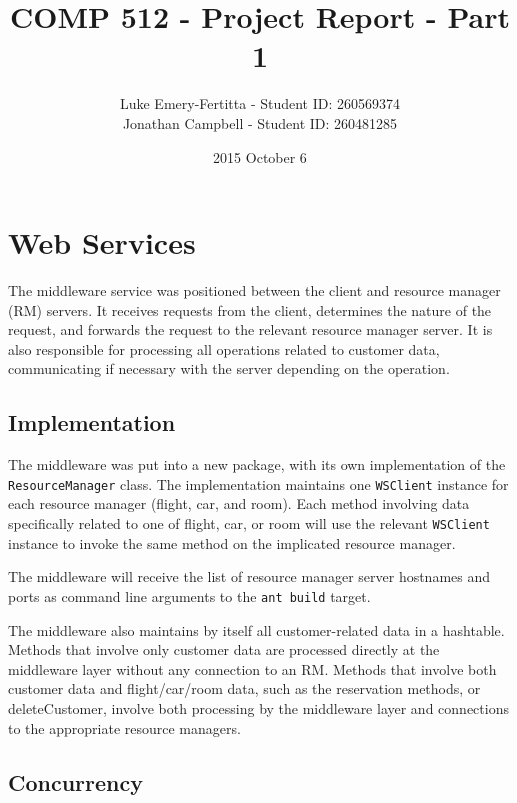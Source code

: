 \documentclass[11pt]{article}
\begin{document}
\title{COMP 512 - Project Report - Part 1}
\author{Luke Emery-Fertitta - Student ID: 260569374 \\ Jonathan Campbell - Student ID: 260481285}
\date{2015 October 6}
\maketitle

\section*{Web Services}

The middleware service was positioned between the client and resource manager (RM) servers. It receives requests from the client, determines the nature of the request, and forwards the request to the relevant resource manager server. It is also responsible for processing all operations related to customer data, communicating if necessary with the server depending on the operation. \par

\subsection*{Implementation} 

The middleware was put into a new package, with its own implementation of the \texttt{ResourceManager} class. The implementation maintains one \texttt{WSClient} instance for each resource manager (flight, car, and room). Each method involving data specifically related to one of flight, car, or room will use the relevant \texttt{WSClient} instance to invoke the same method on the implicated resource manager. \par

The middleware will receive the list of resource manager server hostnames and ports as command line arguments to the \texttt{ant build} target. \par

The middleware also maintains by itself all customer-related data in a hashtable. Methods that involve only customer data are processed directly at the middleware layer without any connection to an RM. Methods that involve both customer data and flight/car/room data, such as the reservation methods, or deleteCustomer, involve both processing by the middleware layer and connections to the appropriate resource managers. \par

\subsection*{Concurrency} 
\end{document}
